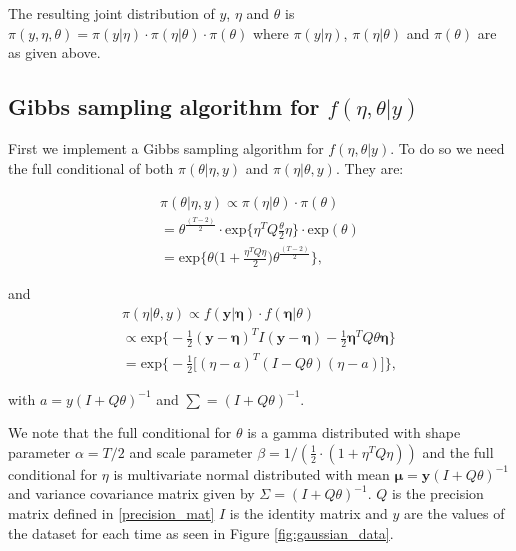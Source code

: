 The resulting joint distribution of $y$, $\eta$ and $\theta$ is  $ \pi(y, \eta, \theta )= \pi(y|\eta) \cdot \pi(\eta|\theta) \cdot \pi(\theta)$ where $\pi(y|\eta)$, $\pi(\eta|\theta)$ and $\pi(\theta)$ are as given above.

\subsection{Gibbs sampling algorithm for $f(\eta, \theta |y)$}
\label{Gibbs}

First we implement a Gibbs sampling algorithm for $f(\eta, \theta |y)$. To do so we need the full conditional of both $\pi(\theta|\eta, y)$ and $\pi(\eta|\theta, y)$. They are:

\begin{align}
    \pi(\theta| \eta, y) \propto \pi(\eta|\theta) \cdot \pi(\theta) \nonumber \\
    = \theta^{\frac{(T-2)}{2}} \cdot \text{exp} \Big\{ \eta^T Q \frac{\theta}{2} \eta \Big\} \cdot \text{exp}(\theta) \nonumber \\
    = \text{exp} \Big\{  \theta \big(1 + \frac{\eta^T Q \eta}{2}  \big) \theta^{\frac{(T-2)}{2}}  \Big\}, 
\end{align}

and 
\begin{align}
    \pi(\eta | \theta, y) \propto f(\boldsymbol{y}|\mathbf{\eta}) \cdot f(\mathbf{\eta}|\theta) \nonumber \\
    \propto \text{exp} \Bigg\{ -\frac{1}{2}(\mathbf{y} - \mathbf{\eta})^T I (\mathbf{y}-\mathbf{\eta}) - \frac{1}{2} \mathbf{\eta}^T Q \theta \mathbf{\eta} \Bigg\} \nonumber \\
    = \text{exp} \Bigg\{  -\frac{1}{2} \Big[ (\eta - a)^T (I - Q\theta) (\eta - a) \Big] \Bigg\}, 
\end{align}

with $a = y(I + Q \theta)^{-1}$ and $\sum = (I + Q \theta)^{-1}$. 

We note that the full conditional for $\theta$ is a gamma distributed with shape parameter $\alpha = T/2$ and scale parameter $\beta = 1/(\frac{1}{2}\cdot (1 + \eta^T Q \eta))$ and the full conditional for $\eta$ is multivariate normal distributed with mean $\boldsymbol{\mu} = \boldsymbol{y}(I + Q \theta)^{-1}$ and variance covariance matrix given by $\Sigma = (I + Q \theta)^{-1}$. $Q$ is the precision matrix defined in  \ref{precision_mat}
$I$ is the identity matrix and $y$ are the values of the dataset for each time as seen in Figure \ref{fig:gaussian_data}. 


